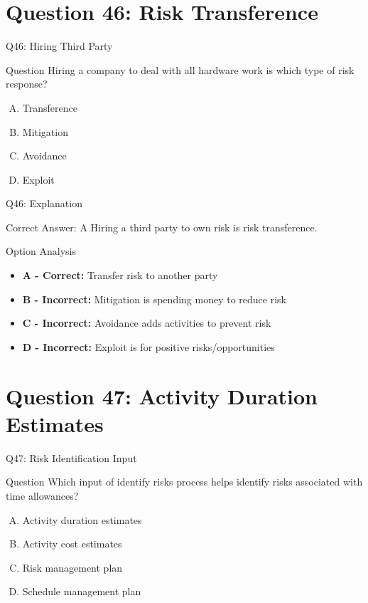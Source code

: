 \documentclass{beamer}
\begin{document}
	\section{Question 46: Risk Transference}
	
	\begin{frame}{Q46: Hiring Third Party}
		\begin{block}{Question}
			Hiring a company to deal with all hardware work is which type of risk response?
		\end{block}
		\begin{enumerate}[(A)]
			\item Transference
			\item Mitigation
			\item Avoidance
			\item Exploit
		\end{enumerate}
	\end{frame}
	
	\begin{frame}{Q46: Explanation}
		\begin{block}{Correct Answer: A}
			Hiring a third party to own risk is risk transference.
		\end{block}
		\begin{block}{Option Analysis}
			\begin{itemize}
				\item \textbf{A - Correct:} Transfer risk to another party
				\item \textbf{B - Incorrect:} Mitigation is spending money to reduce risk
				\item \textbf{C - Incorrect:} Avoidance adds activities to prevent risk
				\item \textbf{D - Incorrect:} Exploit is for positive risks/opportunities
			\end{itemize}
		\end{block}
	\end{frame}
	
	\section{Question 47: Activity Duration Estimates}
	
	\begin{frame}{Q47: Risk Identification Input}
		\begin{block}{Question}
			Which input of identify risks process helps identify risks associated with time allowances?
		\end{block}
		\begin{enumerate}[(A)]
			\item Activity duration estimates
			\item Activity cost estimates
			\item Risk management plan
			\item Schedule management plan
		\end{enumerate}
	\end{frame}
	
\end{document}
